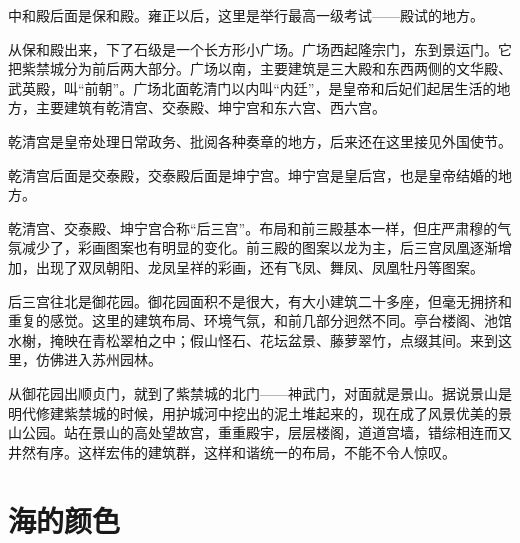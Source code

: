 \documentclass[12pt,UTF-8,openany]{ctexbook}
\begin{document}
\begin{large}
    中和殿后面是保和殿。雍正以后，这里是举行最高一级考试——殿试的地方。
    
    从保和殿出来，下了石级是一个长方形小广场。广场西起隆宗门，东到景运门。它把紫禁城分为前后两大部分。广场以南，主要建筑是三大殿和东西两侧的文华殿、武英殿，叫“前朝”。广场北面乾清门以内叫“内廷”，是皇帝和后妃们起居生活的地方，主要建筑有乾清宫、交泰殿、坤宁宫和东六宫、西六宫。
    
    乾清宫是皇帝处理日常政务、批阅各种奏章的地方，后来还在这里接见外国使节。
    
    乾清宫后面是交泰殿，交泰殿后面是坤宁宫。坤宁宫是皇后宫，也是皇帝结婚的地方。
    
    乾清宫、交泰殿、坤宁宫合称“后三宫”。布局和前三殿基本一样，但庄严肃穆的气氛减少了，彩画图案也有明显的变化。前三殿的图案以龙为主，后三宫凤凰逐渐增加，出现了双凤朝阳、龙凤呈祥的彩画，还有飞凤、舞凤、凤凰牡丹等图案。
    
    后三宫往北是御花园。御花园面积不是很大，有大小建筑二十多座，但毫无拥挤和重复的感觉。这里的建筑布局、环境气氛，和前几部分迥然不同。亭台楼阁、池馆水榭，掩映在青松翠柏之中；假山怪石、花坛盆景、藤萝翠竹，点缀其间。来到这里，仿佛进入苏州园林。
    
    从御花园出顺贞门，就到了紫禁城的北门——神武门，对面就是景山。据说景山是明代修建紫禁城的时候，用护城河中挖出的泥土堆起来的，现在成了风景优美的景山公园。站在景山的高处望故宫，重重殿宇，层层楼阁，道道宫墙，错综相连而又井然有序。这样宏伟的建筑群，这样和谐统一的布局，不能不令人惊叹。
    
\end{large}



\chapter{海的颜色}
\end{document}
